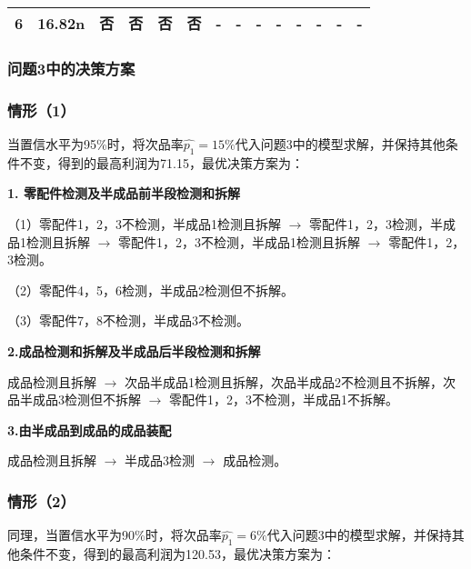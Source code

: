 \documentclass[withoutpreface,bwprint]{cumcmthesis} %
\begin{document}
\begin{table}[htbp]
{\begin{tabular}{c|c|cccc|cccc|cccc}
		6                   & 16.82n                & 否                                                 & 否                                                 & 否                                               & 否                                                 & -                                                 & -                                                 & -                                               & -                                                 & -                                                 & -                                                 & -                                               & -                                                 \\ \bottomrule[1.5pt]
	\end{tabular}
}
\end{table}

\subsubsection{问题3中的决策方案}
\subsubsection*{情形（1）}
当置信水平为95\%时，将次品率$\hat{p_1}=15\%$代入问题3中的模型求解，并保持其他条件不变，得到的最高利润为71.15，最优决策方案为：

\textbf{1. 零配件检测及半成品前半段检测和拆解}

（1）零配件1，2，3不检测，半成品1检测且拆解 $\rightarrow$ 零配件1，2，3检测，半成品1检测且拆解 $\rightarrow$ 零配件1，2，3不检测，半成品1检测且拆解 $\rightarrow$ 零配件1，2，3检测。

（2）零配件4，5，6检测，半成品2检测但不拆解。

（3）零配件7，8不检测，半成品3不检测。

\textbf{2.成品检测和拆解及半成品后半段检测和拆解}

成品检测且拆解 $\rightarrow$ 次品半成品1检测且拆解，次品半成品2不检测且不拆解，次品半成品3检测但不拆解 $\rightarrow$ 零配件1，2，3不检测，半成品1不拆解。

\textbf{3.由半成品到成品的成品装配}

成品检测且拆解 $\rightarrow$ 半成品3检测 $\rightarrow$ 成品检测。

\subsubsection*{情形（2）}
同理，当置信水平为90\%时，将次品率$\hat{p_1}=6\%$代入问题3中的模型求解，并保持其他条件不变，得到的最高利润为120.53，最优决策方案为：
\end{document}
